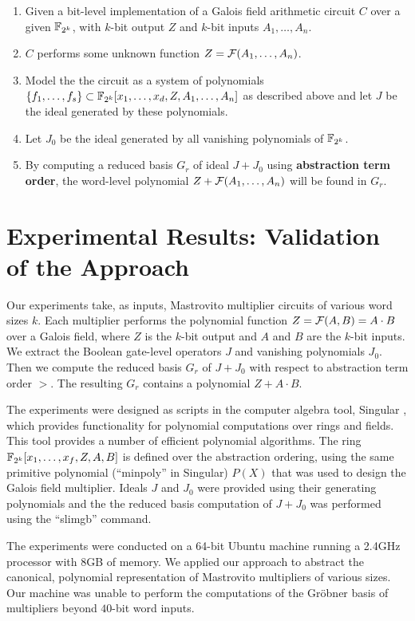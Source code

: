 \begin{enumerate}
\item Given a bit-level implementation of a Galois field arithmetic circuit 
$C$ over a given ${\mathbb{F}}_{2^k}$, 
with $k$-bit output $Z$ and $k$-bit inputs $A_1,\dots,A_n$. 
\item $C$ performs some unknown function $Z={\mathcal{F}}(A_1,\dots,A_n)$.
\item Model the the circuit as a system of polynomials 
$\{f_1,\dots,f_s\}\subset {\mathbb{F}}_{2^k}[x_1,\dots,x_d, Z, A_1, \dots, A_n]$ as 
described above and let $J$ be the ideal generated by these polynomials. 
\item Let $J_0$ be the ideal generated by all vanishing polynomials of 
${\mathbb{F}}_{2^k}$. 
\item By computing a reduced \Grobner basis $G_r$ of ideal $J+J_0$ using 
{\bf abstraction term order}, 
the word-level polynomial $Z+{\mathcal{F}}(A_1,\dots,A_n)$ will be found in $G_r$.
\end{enumerate}

\section{Experimental Results: Validation of the Approach}

Our experiments take, as inputs, Mastrovito \cite{mastro:1989} multiplier 
circuits of various word sizes $k$. Each multiplier performs the polynomial 
function $Z = {\mathcal{F}}(A,B) = A \cdot B$ over a Galois field, 
where $Z$ is the $k$-bit 
output and $A$ and $B$ are the $k$-bit inputs. We extract the 
Boolean gate-level operators $J$ and vanishing polynomials $J_0$.
Then we compute the reduced \Grobner basis $G_r$ of $J + J_0$
with respect to abstraction term order $>$. The resulting $G_r$ contains a 
polynomial $Z + A\cdot B$. 

The experiments were designed as scripts in the computer algebra tool, 
{\sc Singular} \cite{DGPS}, which provides functionality for polynomial
computations over rings and fields. This tool provides a number of efficient 
polynomial algorithms. The ring ${\mathbb{F}}_{2^k}[x_1,\dots,x_f,\allowbreak Z,A,B]$ is defined over
the abstraction ordering, using the same primitive polynomial 
(``minpoly'' in Singular) $P(X)$ that was used to design the Galois field multiplier. 
Ideals  $J$ and $J_0$ were provided using their generating polynomials and the
the reduced \Grobner basis computation of $J+J_0$ was performed
using the ``slimgb'' command.

The experiments were conducted on a 64-bit Ubuntu machine running a 2.4GHz 
processor with 8GB of memory. We applied our approach to
abstract the canonical, polynomial representation of Mastrovito 
multipliers of various sizes.
Our machine was unable to perform the 
computations of the Gr\"obner basis of multipliers beyond $40$-bit word 
inputs. 

